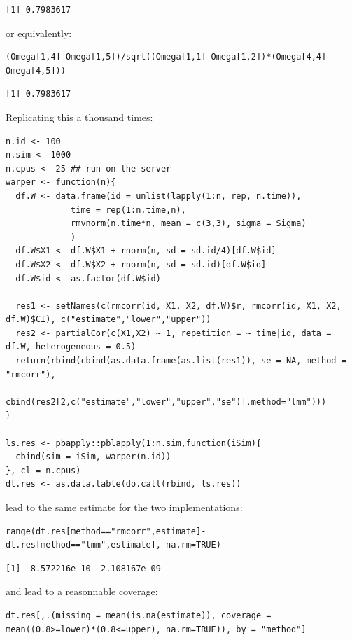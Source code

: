 \documentclass[12pt]{article}
\begin{document}
\begin{verbatim}
[1] 0.7983617
\end{verbatim}


or equivalently:
\lstset{language=r,label= ,caption= ,captionpos=b,numbers=none}
\begin{lstlisting}
(Omega[1,4]-Omega[1,5])/sqrt((Omega[1,1]-Omega[1,2])*(Omega[4,4]-Omega[4,5]))
\end{lstlisting}

\begin{verbatim}
[1] 0.7983617
\end{verbatim}


Replicating this a thousand times:
\lstset{language=r,label= ,caption= ,captionpos=b,numbers=none}
\begin{lstlisting}
n.id <- 100
n.sim <- 1000
n.cpus <- 25 ## run on the server
warper <- function(n){ 
  df.W <- data.frame(id = unlist(lapply(1:n, rep, n.time)),
		     time = rep(1:n.time,n),
		     rmvnorm(n.time*n, mean = c(3,3), sigma = Sigma)
		     )
  df.W$X1 <- df.W$X1 + rnorm(n, sd = sd.id/4)[df.W$id]
  df.W$X2 <- df.W$X2 + rnorm(n, sd = sd.id)[df.W$id]
  df.W$id <- as.factor(df.W$id)

  res1 <- setNames(c(rmcorr(id, X1, X2, df.W)$r, rmcorr(id, X1, X2, df.W)$CI), c("estimate","lower","upper"))
  res2 <- partialCor(c(X1,X2) ~ 1, repetition = ~ time|id, data = df.W, heterogeneous = 0.5)
  return(rbind(cbind(as.data.frame(as.list(res1)), se = NA, method = "rmcorr"),
	       cbind(res2[2,c("estimate","lower","upper","se")],method="lmm")))
}

ls.res <- pbapply::pblapply(1:n.sim,function(iSim){
  cbind(sim = iSim, warper(n.id))
}, cl = n.cpus)
dt.res <- as.data.table(do.call(rbind, ls.res))
\end{lstlisting}

lead to the same estimate for the two implementations:
\lstset{language=r,label= ,caption= ,captionpos=b,numbers=none}
\begin{lstlisting}
range(dt.res[method=="rmcorr",estimate]-dt.res[method=="lmm",estimate], na.rm=TRUE)
\end{lstlisting}

\begin{verbatim}
[1] -8.572216e-10  2.108167e-09
\end{verbatim}


and lead to a reasonnable coverage:
\lstset{language=r,label= ,caption= ,captionpos=b,numbers=none}
\begin{lstlisting}
dt.res[,.(missing = mean(is.na(estimate)), coverage = mean((0.8>=lower)*(0.8<=upper), na.rm=TRUE)), by = "method"]
\end{lstlisting}
\end{document}
